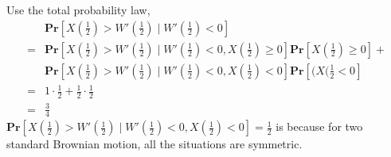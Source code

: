 \documentclass{article}
\theoremstyle{definition}
\begin{document}
\begin{itemize}
		Use the total probability law, 
		\begin{equation}
			\begin{aligned}
				&\mathbf{Pr}[X(\frac{1}{2})>W'(\frac{1}{2})\mid W'(\frac{1}{2})<0] \\
				=&\mathbf{Pr}[X(\frac{1}{2})>W'(\frac{1}{2})\mid W'(\frac{1}{2})<0, X(\frac{1}{2})\geq0]\mathbf{Pr}[X(\frac{1}{2})\geq0]+\\&\mathbf{Pr}[X(\frac{1}{2})>W'(\frac{1}{2})\mid W'(\frac{1}{2})<0, X(\frac{1}{2})<0]\mathbf{Pr}[(X(\frac{1}{2}<0]\\
				=&1\cdot \frac{1}{2} + \frac{1}{2}\cdot\frac{1}{2}\\
				=&\frac{3}{4}
			\end{aligned}
		\end{equation}
		$\mathbf{Pr}[X(\frac{1}{2})>W'(\frac{1}{2})\mid W'(\frac{1}{2})<0, X(\frac{1}{2})<0] = \frac{1}{2}$ is because for two standard Brownian motion, all the situations are symmetric.
	\end{itemize}
\end{document}
